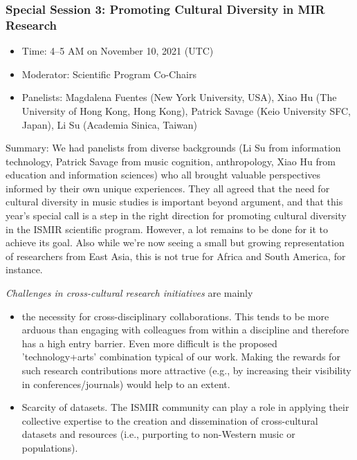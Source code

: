 \documentclass[%
10pt,								%
titlepage,						%
]
{scrartcl}
\begin{document}
        \subsubsection{Special Session 3: Promoting Cultural Diversity in MIR Research}
            \begin{itemize}
                \item   Time: 4--5 AM on November 10, 2021 (UTC)

                \item   Moderator: Scientific Program Co-Chairs

                \item   Panelists: Magdalena Fuentes (New York University, USA), Xiao Hu (The University of Hong Kong, Hong Kong), Patrick Savage (Keio University SFC, Japan), Li Su (Academia Sinica, Taiwan)


            \end{itemize}
            
            Summary:
                We had panelists from diverse backgrounds (Li Su from information technology, Patrick Savage from music cognition, anthropology, Xiao Hu from education and information sciences) who all brought valuable perspectives informed by their own unique experiences. They all agreed that the need for cultural diversity in music studies is important beyond argument, and that this year's special call is a step in the right direction for promoting cultural diversity in the ISMIR scientific program. However, a lot remains to be done for it to achieve its goal. Also while we're now seeing a small but growing representation of researchers from East Asia, this is not true for Africa and South America, for instance.
                
                \textit{Challenges in cross-cultural research initiatives} are mainly
                    \begin{itemize}
                        \item   the necessity for cross-disciplinary collaborations. This tends to be more arduous than engaging with colleagues from within a discipline and therefore has a high entry barrier. Even more difficult is the proposed 'technology+arts' combination typical of our work. Making the rewards for such research contributions more attractive (e.g., by increasing their visibility in conferences/journals) would help to an extent. 
                        \item   Scarcity of datasets. The ISMIR community can play a role in applying their collective expertise to the creation and dissemination of cross-cultural datasets and resources (i.e., purporting to non-Western music or populations). 
                    \end{itemize}
                
\end{document}

